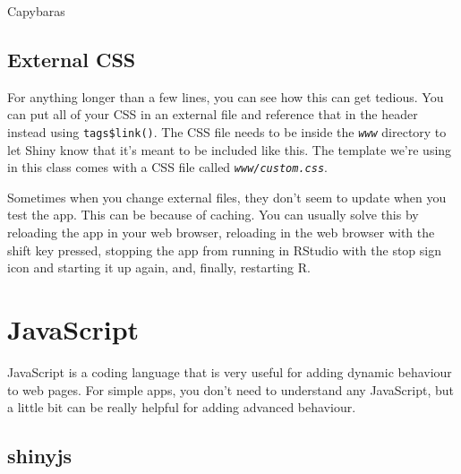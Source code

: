 \documentclass[
  oneside]{book}
\newenvironment{Shaded}{\begin{snugshade}}{\end{snugshade}}
\newcommand{\AttributeTok}[1]{\textcolor[rgb]{0.77,0.63,0.00}{#1}}
\newcommand{\FunctionTok}[1]{\textcolor[rgb]{0.00,0.00,0.00}{#1}}
\newcommand{\NormalTok}[1]{#1}
\newcommand{\SpecialCharTok}[1]{\textcolor[rgb]{0.00,0.00,0.00}{#1}}
\newcommand{\StringTok}[1]{\textcolor[rgb]{0.31,0.60,0.02}{#1}}
\begin{document}
Capybaras

\hypertarget{external-css}{%
\subsection{External CSS}\label{external-css}}

For anything longer than a few lines, you can see how this can get tedious. You can put all of your CSS in an external file and reference that in the header instead using \texttt{tags\$link}\texttt{()}. The CSS file needs to be inside the \textit{\texttt{www}} directory to let Shiny know that it's meant to be included like this. The template we're using in this class comes with a CSS file called \textit{\texttt{www/custom.css}}.

\begin{Shaded}
\end{Shaded}

\begin{warning}
Sometimes when you change external files, they don't seem to update when you test the app. This can be because of caching. You can usually solve this by reloading the app in your web browser, reloading in the web browser with the shift key pressed, stopping the app from running in RStudio with the stop sign icon and starting it up again, and, finally, restarting R.

\end{warning}

\hypertarget{JavaScript}{%
\section{JavaScript}\label{JavaScript}}

JavaScript is a coding language that is very useful for adding dynamic behaviour to web pages. For simple apps, you don't need to understand any JavaScript, but a little bit can be really helpful for adding advanced behaviour.

\hypertarget{shinyjs}{%
\subsection{shinyjs}\label{shinyjs}}
\end{document}
